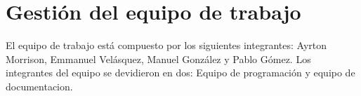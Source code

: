 \section{Gestión del equipo de trabajo}
El equipo de trabajo está compuesto por los siguientes integrantes: Ayrton Morrison, Emmanuel Velásquez, Manuel González y Pablo Gómez. Los integrantes del equipo se devidieron en dos: Equipo de programación y equipo de documentacion.\\
